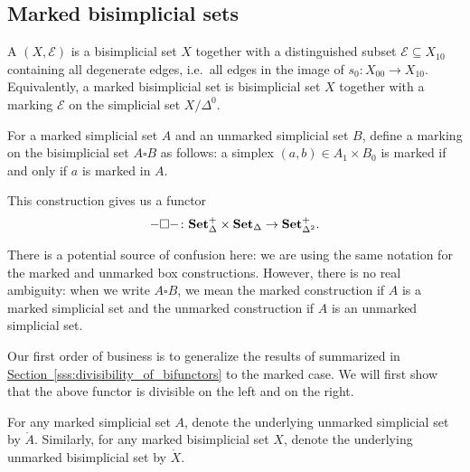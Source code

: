 \documentclass[main.tex]{subfiles}
\begin{document}
\subsection{Marked bisimplicial sets}
\label{ssc:marked_bisimplicial_sets}

\begin{definition}
  A  $(X, \mathcal{E})$ is a bisimplicial set $X$ together with a distinguished subset $\mathcal{E} \subseteq X_{10}$ containing all degenerate edges, i.e.\ all edges in the image of $s_{0}\colon X_{00} \to X_{10}$. Equivalently, a marked bisimplicial set is bisimplicial set $X$ together with a marking $\mathcal{E}$ on the simplicial set $X / \Delta^{0}$.
\end{definition}

\begin{definition}
  For a marked simplicial set $A$ and an unmarked simplicial set $B$, define a marking on the bisimplicial set $A \square B$ as follows: a simplex $(a, b) \in A_{1} \times B_{0}$ is marked if and only if $a$ is marked in $A$.
\end{definition}

This construction gives us a functor
\begin{equation*}
  - \square -  \colon \mathbf{Set}_{\Delta}^{+} \times \mathbf{Set}_{\Delta} \to \mathbf{Set}_{\Delta^{2}}^{+}.
\end{equation*}

There is a potential source of confusion here: we are using the same notation for the marked and unmarked box constructions. However, there is no real ambiguity: when we write $A \square B$, we mean the marked construction if $A$ is a marked simplicial set and the unmarked construction if $A$ is an unmarked simplicial set.

Our first order of business is to generalize the results of \cite{qcats_vs_segal_spaces} summarized in \hyperref[sss:divisibility_of_bifunctors]{Section~\ref*{sss:divisibility_of_bifunctors}} to the marked case. We will first show that the above functor is divisible on the left and on the right.

\begin{notation}
  For any marked simplicial set $A$, denote the underlying unmarked simplicial set by $\mathring{A}$. Similarly, for any marked bisimplicial set $X$, denote the underlying unmarked bisimplicial set by $\mathring{X}$.
\end{notation}
\end{document}
